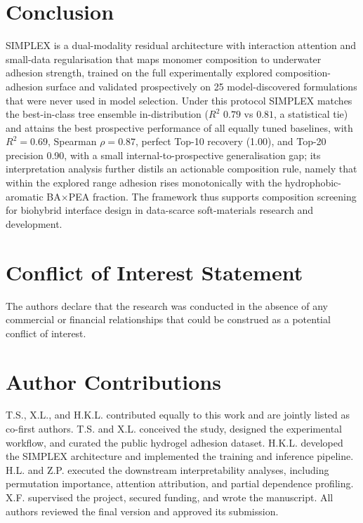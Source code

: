 \documentclass[utf8]{FrontiersinHarvard}
\begin{document}
\section{Conclusion}

SIMPLEX is a dual-modality residual architecture with interaction attention and small-data regularisation that maps monomer composition to underwater adhesion strength, trained on the full experimentally explored composition-adhesion surface and validated prospectively on 25 model-discovered formulations that were never used in model selection. Under this protocol SIMPLEX matches the best-in-class tree ensemble in-distribution ($R^2$ $0.79$ vs $0.81$, a statistical tie) and attains the best prospective performance of all equally tuned baselines, with $R^2 = 0.69$, Spearman $\rho = 0.87$, perfect Top-10 recovery (1.00), and Top-20 precision 0.90, with a small internal-to-prospective generalisation gap; its interpretation analysis further distils an actionable composition rule, namely that within the explored range adhesion rises monotonically with the hydrophobic-aromatic BA$\times$PEA fraction. The framework thus supports composition screening for biohybrid interface design in data-scarce soft-materials research and development.

\section*{Conflict of Interest Statement}

The authors declare that the research was conducted in the absence of any commercial or financial relationships that could be construed as a potential conflict of interest.

\section*{Author Contributions}

T.S., X.L., and H.K.L. contributed equally to this work and are jointly listed as co-first authors. T.S. and X.L. conceived the study, designed the experimental workflow, and curated the public hydrogel adhesion dataset. H.K.L. developed the SIMPLEX architecture and implemented the training and inference pipeline. H.L. and Z.P. executed the downstream interpretability analyses, including permutation importance, attention attribution, and partial dependence profiling. X.F. supervised the project, secured funding, and wrote the manuscript. All authors reviewed the final version and approved its submission.
\end{document}

